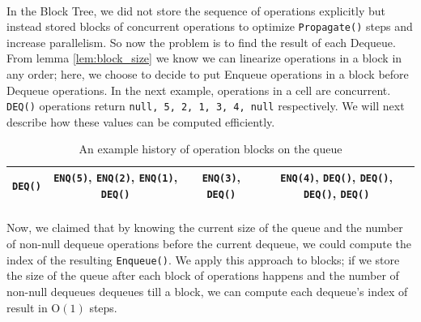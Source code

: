 \documentclass[10pt]{article}
\theoremstyle{definition}
\begin{document}



\paragraph{}
In the Block Tree, we did not store the sequence of operations explicitly but instead stored blocks of concurrent operations to optimize \texttt{Propagate()} steps and increase parallelism. So now the problem is to find the result of each Dequeue. From lemma \ref{lem:block_size} we know we can linearize operations in a block in any order; here, we choose to decide to put Enqueue operations in a block before Dequeue operations. In the next example, operations in a cell are concurrent. \texttt{DEQ()} operations return \texttt{null, 5, 2, 1, 3, 4, null} respectively. We will next describe how these values can be computed efficiently.

\begin{table}[hbt]
\centering
  \begin{tabular}{c|c|c|c}
    \hline \texttt{DEQ()} & \texttt{ENQ(5)}, \texttt{ENQ(2)}, \texttt{ENQ(1)}, \texttt{DEQ()}& \texttt{ENQ(3)}, \texttt{DEQ()}&  \texttt{ENQ(4)}, \texttt{DEQ()}, \texttt{DEQ()}, \texttt{DEQ()}, \texttt{DEQ()}\\ \hline
  \end{tabular}
  \caption{An example history of operation blocks on the queue}
\end{table}


\paragraph{}
Now, we claimed that by knowing the current size of the queue and the number of non-null dequeue operations before the current dequeue, we could compute the index of the resulting \texttt{Enqueue()}. We apply this approach to blocks; if we store the size of the queue after each block of operations happens and the number of non-null dequeues dequeues till a block, we can compute each dequeue's index of result in \textsc{O}$(1)$ steps.
\end{document}

